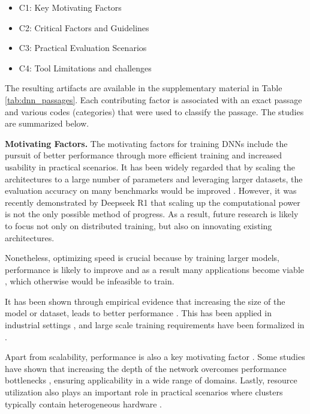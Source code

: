 \begin{itemize}
	\item C1: Key Motivating Factors
	\item C2: Critical Factors and Guidelines
	\item C3: Practical Evaluation Scenarios
	\item C4: Tool Limitations and challenges
\end{itemize}

The resulting artifacts are available in the supplementary material in Table
\ref{tab:dnn_passages}. Each contributing factor is associated with an exact passage and various
codes (categories) that were used to classify the passage. The studies are summarized below.

\textbf{Motivating Factors.}
The motivating factors for training DNNs include the pursuit of better performance through more
efficient training and increased usability in practical scenarios. It has been widely regarded that
by scaling the architectures to a large number of parameters and leveraging larger datasets, the
evaluation accuracy on many benchmarks would be improved \cite{hestness_deep_2017}. However, it was
recently demonstrated by Deepseek R1
\cite{deepseekai2025deepseekr1incentivizingreasoningcapability} that scaling up the computational
power is not the only possible method of progress. As a result, future research is likely to focus
not only on distributed training, but also on innovating existing architectures.

Nonetheless, optimizing speed is crucial because by training larger models, performance is likely to
improve  and as a result many applications become viable , which
otherwise would be infeasible to train.

It has been shown through empirical evidence that increasing the size of the model or dataset,
leads to better performance . This has been applied in industrial settings
, and large scale training requirements have been formalized in
.

Apart from scalability, performance is also a key motivating factor . Some
studies have shown that increasing the depth of the network overcomes performance bottlenecks
, ensuring applicability in a wide range of domains. Lastly, resource utilization
also plays an important role in practical scenarios where clusters typically contain heterogeneous
hardware .


